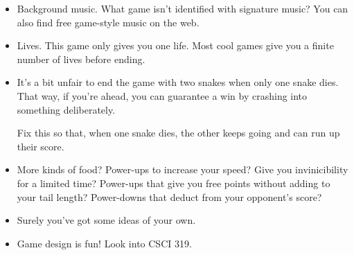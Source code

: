 \documentclass[12pt]{article}
\begin{document}
\begin{description}
\begin{itemize}
\item Background music.  What game isn't identified with signature
music?  You can also find free game-style music on the web.

\item Lives.  This game only gives you one life.  Most cool
games give you a finite number of lives before ending.

\item It's a bit unfair to end the game with two snakes when
only one snake dies.  That way, if you're ahead, you can 
guarantee a win by crashing into something deliberately.

Fix this so that, when one snake dies, the other keeps going
and can run up their score.

\item More kinds of food?  Power-ups to increase your speed?
Give you invinicibility for a limited time?  Power-ups that give
you free points without adding to your tail length?  Power-downs
that deduct from your opponent's score?

\item Surely you've got some ideas of your own. 

\item Game design is fun!
Look into CSCI 319.
\end{itemize}




\end{description}
\end{document}
